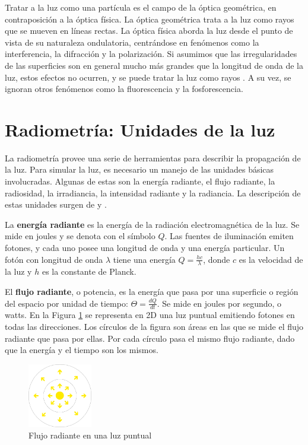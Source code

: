 Tratar a la luz como una partícula es el campo de la óptica geométrica, en contraposición a la óptica física.
La óptica geométrica trata a la luz como rayos que se mueven en líneas rectas.
La óptica física aborda la luz desde el punto de vista de su naturaleza ondulatoria, centrándose en fenómenos como la interferencia, la difracción y la polarización.
Si asumimos que las irregularidades de las superficies son en general mucho más grandes que la longitud de onda de la luz, estos efectos no ocurren, y se puede tratar la luz como rayos \cite{rtr}.
A su vez, se ignoran otros fenómenos como la fluorescencia y la fosforescencia.


\section{Radiometría: Unidades de la luz}\label{sec:radiometry}

La radiometría provee una serie de herramientas para describir la propagación de la luz.
Para simular la luz, es necesario un manejo de las unidades básicas involucradas.
Algunas de estas son la energía radiante, el flujo radiante, la radiosidad, la irradiancia, la intensidad radiante y la radiancia.
La descripción de estas unidades surgen de \cite{rtr} y \cite{pbr}.

La \textbf{energía radiante} es la energía de la radiación electromagnética de la luz.
Se mide en joules y se denota con el símbolo $Q$.
Las fuentes de iluminación emiten fotones, y cada uno posee una longitud de onda y una energía particular.
Un fotón con longitud de onda $\lambda$ tiene una energía $Q = \frac{hc}{\lambda}$, donde $c$ es la velocidad de la luz y $h$ es la constante de Planck.

El \textbf{flujo radiante}, o potencia, es la energía que pasa por una superficie o región del espacio por unidad de tiempo: $\Theta = \frac{dQ}{dt}$.
Se mide en joules por segundo, o watts.
En la Figura \ref{fig:point-light-flux} se representa en 2D una luz puntual emitiendo fotones en todas las direcciones.
Los círculos de la figura son áreas en las que se mide el flujo radiante que pasa por ellas.
Por cada círculo pasa el mismo flujo radiante, dado que la energía y el tiempo son los mismos.

\begin{figure}[ht]
    \centering
    \includegraphics[width=0.25\textwidth]{point-light-flux.png}
    \caption{Flujo radiante en una luz puntual}
    \label{fig:point-light-flux}
\end{figure}

